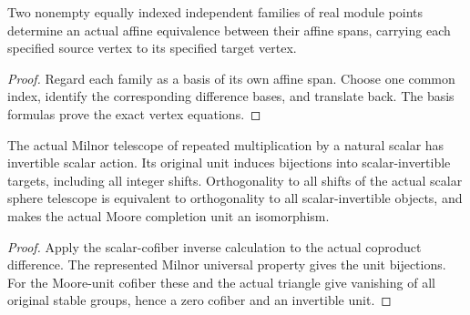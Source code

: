 \begin{proposition}
  \label{prop:actual-independent-span-affine-equivalence}
  \leanok
  Two nonempty equally indexed independent families of real module points determine an actual affine equivalence between their affine spans, carrying each specified source vertex to its specified target vertex.
\end{proposition}
\begin{proof}
  Regard each family as a basis of its own affine span. Choose one common index, identify the corresponding difference bases, and translate back. The basis formulas prove the exact vertex equations.
  \leanok
\end{proof}

\begin{proposition}
  \label{prop:actual-scalar-telescope-completeness-detection}
  \leanok
  The actual Milnor telescope of repeated multiplication by a natural scalar has invertible scalar action. Its original unit induces bijections into scalar-invertible targets, including all integer shifts. Orthogonality to all shifts of the actual scalar sphere telescope is equivalent to orthogonality to all scalar-invertible objects, and makes the actual Moore completion unit an isomorphism.
\end{proposition}
\begin{proof}
  Apply the scalar-cofiber inverse calculation to the actual coproduct difference. The represented Milnor universal property gives the unit bijections. For the Moore-unit cofiber these and the actual triangle give vanishing of all original stable groups, hence a zero cofiber and an invertible unit.
  \leanok
\end{proof}

